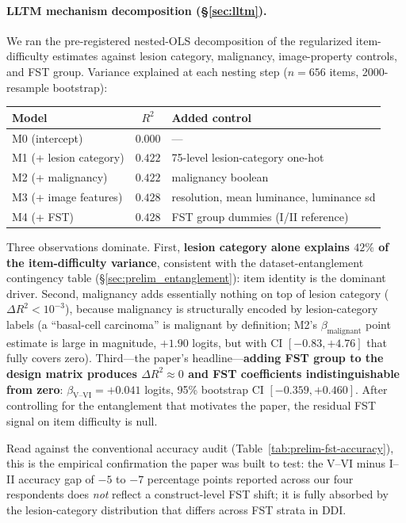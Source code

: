 \documentclass{article}
\begin{document}
\paragraph{LLTM mechanism decomposition (\S\ref{sec:lltm}).}
\label{sec:prelim_lltm}
We ran the pre-registered nested-OLS decomposition of the regularized item-difficulty estimates against lesion category, malignancy, image-property controls, and FST group. Variance explained at each nesting step ($n = 656$ items, 2000-resample bootstrap):
\begin{center}
\small
\begin{tabular}{lcl}
\toprule
Model & $R^2$ & Added control \\
\midrule
M0 (intercept) & $0.000$ & --- \\
M1 (+ lesion category) & $0.422$ & 75-level lesion-category one-hot \\
M2 (+ malignancy) & $0.422$ & malignancy boolean \\
M3 (+ image features) & $0.428$ & resolution, mean luminance, luminance sd \\
M4 (+ FST) & $0.428$ & FST group dummies (I/II reference) \\
\bottomrule
\end{tabular}
\end{center}
Three observations dominate. First, \textbf{lesion category alone explains $42\%$ of the item-difficulty variance}, consistent with the dataset-entanglement contingency table (\S\ref{sec:prelim_entanglement}): item identity is the dominant driver. Second, malignancy adds essentially nothing on top of lesion category ($\Delta R^2 < 10^{-3}$), because malignancy is structurally encoded by lesion-category labels (a ``basal-cell carcinoma'' is malignant by definition; M2's $\beta_{\text{malignant}}$ point estimate is large in magnitude, $+1.90$ logits, but with CI $[-0.83, +4.76]$ that fully covers zero). Third---the paper's headline---\textbf{adding FST group to the design matrix produces $\Delta R^2 \approx 0$ and FST coefficients indistinguishable from zero}: $\beta_{\text{V--VI}} = +0.041$ logits, 95\% bootstrap CI $[-0.359, +0.460]$. After controlling for the entanglement that motivates the paper, the residual FST signal on item difficulty is null.

Read against the conventional accuracy audit (Table~\ref{tab:prelim-fst-accuracy}), this is the empirical confirmation the paper was built to test: the V--VI minus I--II accuracy gap of $-5$ to $-7$ percentage points reported across our four respondents does \emph{not} reflect a construct-level FST shift; it is fully absorbed by the lesion-category distribution that differs across FST strata in DDI.
\end{document}
